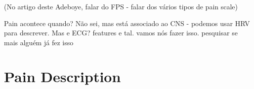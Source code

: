 (No artigo deste Adeboye, falar do FPS - falar dos vários tipos de pain scale)


Pain acontece quando? Não sei, mas está associado ao CNS - podemos usar HRV para descrever. Mas e ECG? features e tal. vamos nós fazer isso. pesquisar se mais alguém já fez isso


\section{Pain Description}

